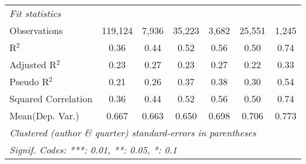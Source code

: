 \begin{tabular}{lcccccc}
   \midrule
   \emph{Fit statistics}\\
   Observations                                               & 119,124       & 7,936   & 35,223        & 3,682        & 25,551  & 1,245\\  
   R$^2$                                                      & 0.36          & 0.44    & 0.52          & 0.56         & 0.50    & 0.74\\  
   Adjusted R$^2$                                             & 0.23          & 0.27    & 0.23          & 0.27         & 0.22    & 0.33\\  
   Pseudo R$^2$                                               & 0.21          & 0.26    & 0.37          & 0.38         & 0.30    & 0.54\\  
   Squared Correlation                                        & 0.36          & 0.44    & 0.52          & 0.56         & 0.50    & 0.74\\  
Mean(Dep. Var.) & 0.667 & 0.663 & 0.650 & 0.698 & 0.706 & 0.773 \\
   \midrule \midrule
   \multicolumn{7}{l}{\emph{Clustered (author \& quarter) standard-errors in parentheses}}\\
   \multicolumn{7}{l}{\emph{Signif. Codes: ***: 0.01, **: 0.05, *: 0.1}}\\
\end{tabular}
\par\endgroup

